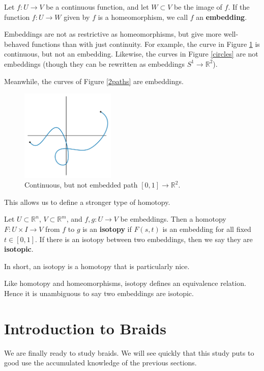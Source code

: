 \documentclass{amsart}
\begin{document}
\begin{definition}
  Let \(f: U\to V\) be a continuous function, and let \(W\subset V\) be the
  image of \(f\). If the function \(f:U\to W\) given by \(f\) is a
  homeomorphism, we call \(f\) an \textbf{embedding}.
\end{definition}

\begin{example}
   Embeddings are not as restrictive as homeomorphisms, but give more
	well-behaved functions than with just continuity. For example, the curve in
	Figure \ref{not-embedding} is continuous, but not an embedding. Likewise,
	the curves in Figure \ref{circles} are not embeddings (though they can be
	rewritten as embeddings \(S^1\to\mathbb{R}^2\)).

	Meanwhile, the curves of Figure \ref{2paths} are embeddings.
	\begin{figure}[!h]
	   \centering
		\includegraphics[width=0.4\textwidth]{Inkscape Files/not-embedding.png}
		\caption{Continuous, but not embedded path \([0, 1]\to\mathbb{R}^2\).}
		\label{not-embedding}
	\end{figure}
\end{example}

This allows us to define a stronger type of homotopy.
\begin{definition}
   Let \(U\subset\mathbb{R}^n\), \(V\subset\mathbb{R}^m\), and \(f, g: U\to V\)
	be embeddings. Then a homotopy \(F: U\times I\to V\) from \(f\) to \(g\) is
	an \textbf{isotopy} if \(F(s, t)\) is an embedding for all fixed \(t\in [0,
	1]\). If there is an isotopy between two embeddings, then we say they are
	\textbf{isotopic}.
\end{definition}
In short, an isotopy is a homotopy that is particularly nice.

Like homotopy and homeomorphisms, isotopy defines an equivalence relation.
Hence it is unambiguous to say two embeddings are isotopic.

\section{Introduction to Braids}\label{introduction-to-braids}
We are finally ready to study braids. We will see quickly that this study
puts to good use the accumulated knowledge of the previous sections.
\end{document}
